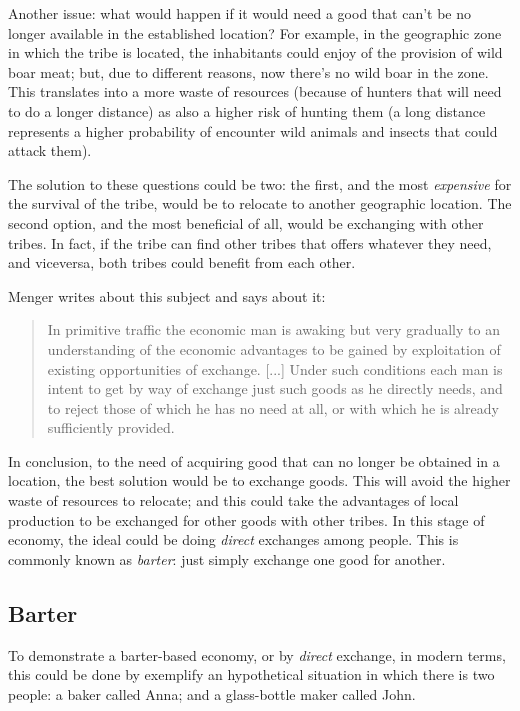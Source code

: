 \documentclass[12pt,a4paper,twoside]{book}
\begin{document}
Another issue: what would happen if it would need a good that can't be no longer available in the established location? For example, in the geographic zone in which the tribe is located, the inhabitants could enjoy of the provision of wild boar meat; but, due to different reasons, now there's no wild boar in the zone. This translates into a more waste of resources (because of hunters that will need to do a longer distance) as also a higher risk of hunting them (a long distance represents a higher probability of encounter wild animals and insects that could attack them).

The solution to these questions could be two: the first, and the most \textit{expensive} for the survival of the tribe, would be to relocate to another geographic location. The second option, and the most beneficial of all, would be exchanging with other tribes. In fact, if the tribe can find other tribes that offers whatever they need, and viceversa, both tribes could benefit from each other.

Menger writes about this subject and says about it:

\begin{quotation}
In primitive traffic the economic man is awaking but very gradually to an understanding of the economic advantages to be gained by exploitation of existing opportunities of exchange. [...] Under such conditions each man is intent to get by way of exchange just such goods as he directly needs, and to reject those of which he has no need at all, or with which he is already sufficiently provided. \cite[p. 19]{menger:origins}
\end{quotation}

In conclusion, to the need of acquiring good that can no longer be obtained in a location, the best solution would be to exchange goods. This will avoid the higher waste of resources to relocate; and this could take the advantages of local production to be exchanged for other goods with other tribes. In this stage of economy, the ideal could be doing \textit{direct} exchanges among people. This is commonly known as \textit{barter}: just simply exchange one good for another.

\subsection{Barter}
To demonstrate a barter-based economy, or by \textit{direct} exchange, in modern terms, this could be done by exemplify an hypothetical situation in which there is two people: a baker called Anna; and a glass-bottle maker called John.
\end{document}
